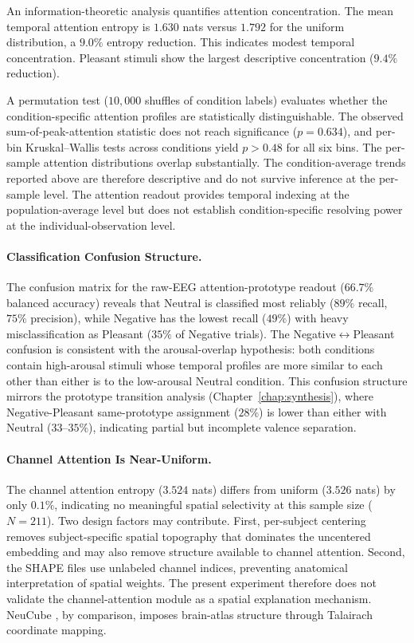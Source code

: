 An information-theoretic analysis quantifies attention concentration. The mean temporal attention entropy is $1.630$ nats versus $1.792$ for the uniform distribution, a $9.0\%$ entropy reduction. This indicates modest temporal concentration. Pleasant stimuli show the largest descriptive concentration ($9.4\%$ reduction).

A permutation test ($10{,}000$ shuffles of condition labels) evaluates whether the condition-specific attention profiles are statistically distinguishable. The observed sum-of-peak-attention statistic does not reach significance ($p = 0.634$), and per-bin Kruskal--Wallis tests across conditions yield $p > 0.48$ for all six bins. The per-sample attention distributions overlap substantially. The condition-average trends reported above are therefore descriptive and do not survive inference at the per-sample level. The attention readout provides temporal indexing at the population-average level but does not establish condition-specific resolving power at the individual-observation level.

\paragraph{Classification Confusion Structure.} The confusion matrix for the raw-EEG attention-prototype readout ($66.7\%$ balanced accuracy) reveals that Neutral is classified most reliably ($89\%$ recall, $75\%$ precision), while Negative has the lowest recall ($49\%$) with heavy misclassification as Pleasant ($35\%$ of Negative trials). The Negative$\leftrightarrow$Pleasant confusion is consistent with the arousal-overlap hypothesis: both conditions contain high-arousal stimuli whose temporal profiles are more similar to each other than either is to the low-arousal Neutral condition. This confusion structure mirrors the prototype transition analysis (Chapter~\ref{chap:synthesis}), where Negative-Pleasant same-prototype assignment ($28\%$) is lower than either with Neutral ($33$--$35\%$), indicating partial but incomplete valence separation.

\paragraph{Channel Attention Is Near-Uniform.} The channel attention entropy ($3.524$ nats) differs from uniform ($3.526$ nats) by only $0.1\%$, indicating no meaningful spatial selectivity at this sample size ($N = 211$). Two design factors may contribute. First, per-subject centering removes subject-specific spatial topography that dominates the uncentered embedding and may also remove structure available to channel attention. Second, the SHAPE files use unlabeled channel indices, preventing anatomical interpretation of spatial weights. The present experiment therefore does not validate the channel-attention module as a spatial explanation mechanism. NeuCube \cite{kasabov_neucube_2014}, by comparison, imposes brain-atlas structure through Talairach coordinate mapping.

